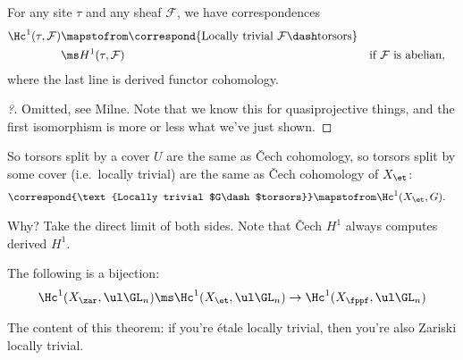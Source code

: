 \begin{proposition}[Identification of $H^1$]

For any site \(\tau\) and any sheaf \(\mathcal{F}\), we have
correspondences
\begin{align*}
\Hc^1(\tau, \mathcal{F})
&\mapstofrom
\correspond{\text{Locally trivial } \mathcal{F}\dash\text{torsors}} \\
&\ms H^1(\tau, \mathcal{F}) && \text{if $\mathcal{F}$ is abelian}
,\end{align*} where the last line is derived functor cohomology.

\end{proposition}

\begin{proof}[?]

Omitted, see Milne. Note that we know this for quasiprojective things,
and the first isomorphism is more or less what we've just shown.

\end{proof}

\begin{corollary}

So torsors split by a cover \(U\) are the same as Čech cohomology, so
torsors split by some cover (i.e.~locally trivial) are the same as Čech
cohomology of \(X_\et\):
\begin{align*}  
\correspond{\text{Locally trivial $G\dash$torsors}}
&\mapstofrom
\Hc^1(X_\et, G)
.\end{align*}

\end{corollary}

Why? Take the direct limit of both sides. Note that Čech \(H^1\) always
computes derived \(H^1\).

\begin{theorem}\label{thm:hilb90}

The following is a bijection:
\begin{align*}  
\Hc^1(X_\zar, \ul \GL_n)
\ms
\Hc^1(X_\et, \ul \GL_n)
\to
\Hc^1(X_\fppf, \ul \GL_n)
\end{align*}

\end{theorem}

\begin{remark}

The content of this theorem: if you're étale locally trivial, then
you're also Zariski locally trivial.

\end{remark}

